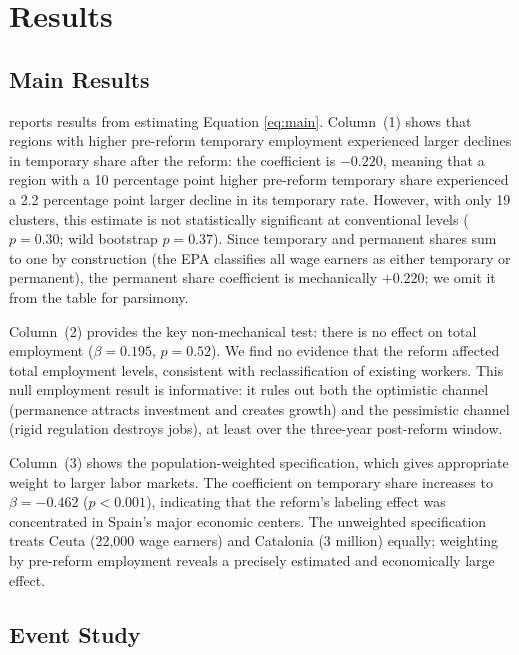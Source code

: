 \documentclass[12pt]{article}
\begin{document}
\section{Results}
\label{sec:results}

\subsection{Main Results}



 reports results from estimating Equation \eqref{eq:main}. Column~(1) shows that regions with higher pre-reform temporary employment experienced larger declines in temporary share after the reform: the coefficient is $-0.220$, meaning that a region with a 10 percentage point higher pre-reform temporary share experienced a 2.2 percentage point larger decline in its temporary rate. However, with only 19 clusters, this estimate is not statistically significant at conventional levels ($p = 0.30$; wild bootstrap $p = 0.37$). Since temporary and permanent shares sum to one by construction (the EPA classifies all wage earners as either temporary or permanent), the permanent share coefficient is mechanically $+0.220$; we omit it from the table for parsimony.

Column~(2) provides the key non-mechanical test: there is no effect on total employment ($\beta = 0.195$, $p = 0.52$). We find no evidence that the reform affected total employment levels, consistent with reclassification of existing workers. This null employment result is informative: it rules out both the optimistic channel (permanence attracts investment and creates growth) and the pessimistic channel (rigid regulation destroys jobs), at least over the three-year post-reform window.

Column~(3) shows the population-weighted specification, which gives appropriate weight to larger labor markets. The coefficient on temporary share increases to $\beta = -0.462$ ($p < 0.001$), indicating that the reform's labeling effect was concentrated in Spain's major economic centers. The unweighted specification treats Ceuta (22,000 wage earners) and Catalonia (3 million) equally; weighting by pre-reform employment reveals a precisely estimated and economically large effect.

\subsection{Event Study}
\end{document}
